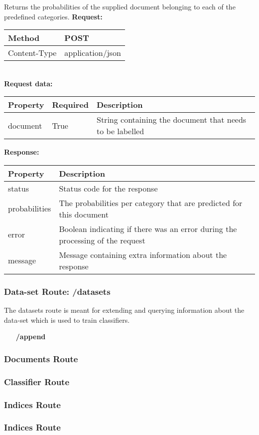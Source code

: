 \begin{enumerate}
Returns the probabilities of the supplied document belonging to each of the predefined categories. 
\newline
\newline
\textbf{Request:}
\newline
\newline
\begin{tabular}{ | l | l |}
\hline
Method & POST\\ \hline
Content-Type & application/json\\ \hline
\end{tabular}
\\
\textbf{Request data:}\\
\begin{tabular}{ | l | l | l |}
\hline
\textbf{Property} & \textbf{Required} & \textbf{Description}\\ \hline
document & True & String containing the document that needs to be labelled\\ \hline
\end{tabular}
\newline
\newline
\textbf{Response:}
\newline
\newline
\begin{tabular}{ | l | l |}
\hline
\textbf{Property} & \textbf{Description}\\ \hline
status & Status code for the response\\ \hline
probabilities & The probabilities per category that are predicted for this document\\ \hline
error & Boolean indicating if there was an error during the processing of the request\\ \hline
message & Message containing extra information about the response\\ \hline
\end{tabular}
\end{enumerate}


\subsubsection{Data-set Route: /datasets}
The datasets route is meant for extending and querying information about the data-set which is used to train classifiers. 

\begin{enumerate}
    \item [\textbf{/append}]
\end{enumerate}







\subsubsection{Documents Route}
\subsubsection{Classifier Route}
\subsubsection{Indices Route}
\subsubsection{Indices Route}